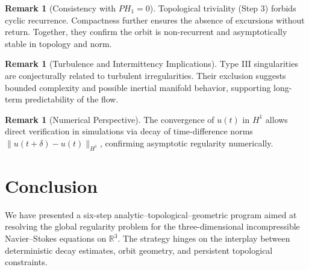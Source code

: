 \documentclass[11pt]{article}
\theoremstyle{definition}
\newtheorem{remark}[theorem]{Remark}
\begin{document}
\begin{remark}[Consistency with $PH_1 = 0$]
Topological triviality (Step 3) forbids cyclic recurrence. Compactness further ensures the absence of excursions without return. Together, they confirm the orbit is non-recurrent and asymptotically stable in topology and norm.
\end{remark}

\begin{remark}[Turbulence and Intermittency Implications]
Type III singularities are conjecturally related to turbulent irregularities. Their exclusion suggests bounded complexity and possible inertial manifold behavior, supporting long-term predictability of the flow.
\end{remark}

\begin{remark}[Numerical Perspective]
The convergence of $u(t)$ in $H^1$ allows direct verification in simulations via decay of time-difference norms $\|u(t+\delta) - u(t)\|_{H^1}$, confirming asymptotic regularity numerically.
\end{remark}


\section{Conclusion}
\label{sec:conclusion}

We have presented a six-step analytic–topological–geometric program aimed at resolving the global regularity problem for the three-dimensional incompressible Navier–Stokes equations on \( \mathbb{R}^3 \). The strategy hinges on the interplay between deterministic decay estimates, orbit geometry, and persistent topological constraints.
\end{document}
